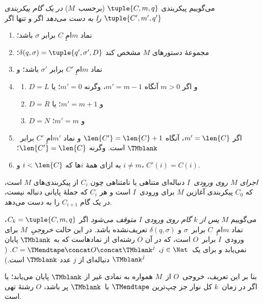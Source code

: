 \documentclass[../../../include/open-logic-section]{subfiles}
\begin{document}
\begin{defn}
می‌گوییم پیکربندی $\tuple{C,m,q}$ (برحسب~$M$)
\emph{در یک گام پیکربندی $\tuple{C',m',q'}$ را به دست می‌دهد} اگر و
تنها اگر
\begin{enumerate}
\item نماد $m$امِ $C$ برابر $\sigma$ باشد؛
\item مجموعهٔ دستورهای $M$ مشخص کند
  $\delta(q,\sigma)=\tuple{q',\sigma',D}$؛
\item نماد $m$امِ $C'$ برابر $\sigma'$ باشد؛ و
\item
\begin{enumerate}
\item $D=L$ و اگر $m>0$ آنگاه $m'=m-1$، وگرنه $m'=0$؛ یا
\item $D=R$ و $m'=m+1$؛ یا
\item $D=N$ و $m'=m$؛
\end{enumerate}
\item اگر $m'=\len{C}$، آنگاه $\len{C'}=\len{C}+1$ و نماد $m'$امِ
  $C'$ برابر~$\TMblank$ است. وگرنه $\len{C'}=\len{C}$؛
\item به ازای همهٔ $i$ها که $i<\len{C}$ و $i\neq m$،
  $C'(i)=C(i)$.
\end{enumerate}
\end{defn}

\begin{defn}
\emph{اجرای $M$ روی ورودی~$I$} دنباله‌ای متناهی یا نامتناهی چون $C_i$
از پیکربندی‌های $M$ است، که $C_0$ پیکربندی آغازین $M$ برای ورودی~$I$
است و هر $C_i$ که جملهٔ پایانی دنباله نیست، در یک گام $C_{i+1}$ را
به دست می‌دهد.

می‌گوییم $M$ \emph{پس از $k$ گام روی ورودی $I$ متوقف می‌شود} اگر
$C_k=\tuple{C,m,q}$، نماد $m$امِ~$C$ برابر~$\sigma$ و
$\delta(q,\sigma)$ تعریف‌نشده باشد. در این حالت \emph{خروجیِ}~$M$
برای ورودی~$I$ برابر~$O$ است، که در آن $O$ رشته‌ای از نمادهاست که به
$\TMblank$ پایان نمی‌یابد و برای یک~$j\in\Nat$،
$C=\TMendtape\concat O\concat\TMblank^j$.
($\TMblank^j$ دنباله‌ای از $j$ عدد $\TMblank$ است.)
\end{defn}

\begin{explain}
بنا بر این تعریف، خروجی~$O$ از~$M$ همواره به نمادی غیر از
$\TMblank$ پایان می‌یابد؛ یا اگر در زمان~$k$ کل نوار جز چپ‌ترین
$\TMendtape$ با~$\TMblank$ پر باشد، $O$ رشتهٔ تهی است.
\end{explain}
\end{document}
